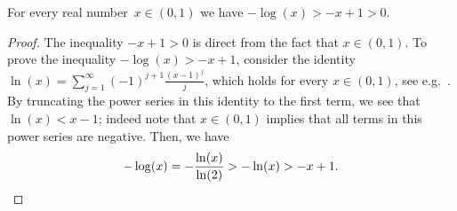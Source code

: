 \begin{lemma}
  \label{lemma:logx-to-x}
  For every real number~$x \in (0,1)$ 
  we have $-\log(x) > -x+1 > 0$.
\end{lemma}

\begin{proof}
  The inequality $-x+1 > 0$ is direct from the fact 
  that $x \in (0,1)$. 
  To prove the inequality ${-\log(x) > -x+1}$, 
  consider the identity $\ln(x) = \sum_{j=1}^\infty (-1)^{j+1} \frac{(x-1)^j}{j}$,
  which holds for every $x \in (0,1)$, 
  see e.g.~\cite[Equation~4.6.3]{Olver10}. 
  By truncating the power series in this identity to the first 
  term, we see that $\ln(x) < x-1$; 
  indeed note that $x \in (0,1)$ implies that all terms in 
  this power series are negative.
  Then, we have 
  \[ 
  -\log(x) = -\frac{\ln(x)}{\ln(2)} > -\ln(x) > -x+1.
  \qedhere
  \]
\end{proof}

